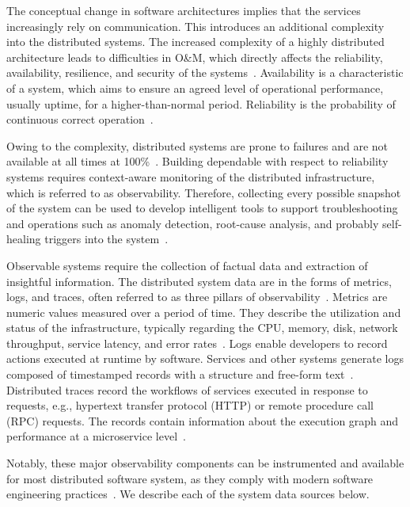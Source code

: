 The conceptual change in software architectures implies that the services increasingly rely on communication. This introduces an additional complexity into the distributed systems. The increased complexity of a highly distributed architecture leads to difficulties in O\&M, which directly affects the reliability, availability, resilience, and security of the systems~\cite{newman2015building}.
Availability is a characteristic of a system, which aims to ensure an agreed level of operational performance, usually uptime, for a higher-than-normal period. Reliability is the probability of continuous correct operation~\cite{malkawi2013art}.

Owing to the complexity, distributed systems are prone to failures and are not available at all times at 100\%~\cite{gunawi2014bugs,sillito2020failures}. Building dependable with respect to reliability systems requires context-aware monitoring of the distributed infrastructure, which is referred to as observability. Therefore, collecting every possible snapshot of the system can be used to develop intelligent tools to support troubleshooting and operations such as anomaly detection, root-cause analysis, and probably self-healing triggers into the system~\cite{observability2020practical}. 

Observable systems require the collection of factual data and extraction of insightful information. The distributed system data are in the forms of metrics, logs, and traces, often referred to as three pillars of observability~\cite{nedelkoski2020data,observability2020practical}.
Metrics are numeric values measured over a period of time. They describe the utilization and status of the infrastructure, typically regarding the CPU, memory, disk, network throughput, service latency, and error rates~\cite{nedelkoski2019anomaly,schmidt2018iftm,}. 
Logs enable developers to record actions executed at runtime by software. Services and other systems generate logs composed of timestamped records with a structure and free-form text~\cite{jakublogs,tang2011logsig,du2017deeplog,meng2019loganomaly}.
Distributed traces record the workflows of services executed in response to requests, e.g., hypertext transfer protocol (HTTP) or remote procedure call (RPC) requests. The records contain information about the execution graph and performance at a microservice level~\cite{RepTrace,nedelkoski2020selftracing,nedelkoski2019anomalymultimodal}.

Notably, these major observability components can be instrumented and available for most distributed software system, as they comply with modern software engineering practices~\cite{sridharan2018distributed}. 
We describe each of the system data sources below.

